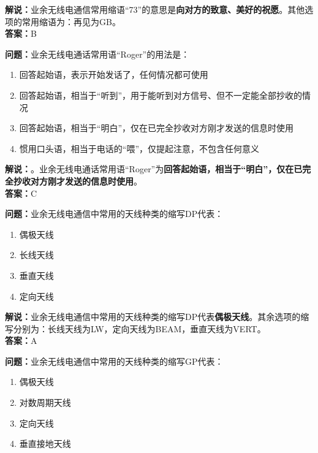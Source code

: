 \documentclass{ctexbook}
\begin{document}
\noindent\textbf{解说：}业余无线电通信常用缩语“73”的意思是\textbf{向对方的致意、美好的祝愿}。其他选项的常用缩语为：再见为GB。\\\noindent\textbf{答案：}B


\bigskip


\noindent\textbf{问题：}业余无线电通话常用语“Roger”的用法是：

\begin{enumerate}[label=\Alph*), leftmargin=3em]
	\item 回答起始语，表示开始发话了，任何情况都可使用
	\item 回答起始语，相当于“听到”，用于能听到对方信号、但不一定能全部抄收的情况
	\item 回答起始语，相当于“明白”，仅在已完全抄收对方刚才发送的信息时使用
	\item 惯用口头语，相当于电话的“喂”，仅提起注意，不包含任何意义
\end{enumerate}

\noindent\textbf{解说：}。业余无线电通话常用语“Roger”为\textbf{回答起始语，相当于“明白”，仅在已完全抄收对方刚才发送的信息时使用}。\\\noindent\textbf{答案：}C


\bigskip


\noindent\textbf{问题：}业余无线电通信中常用的天线种类的缩写DP代表：

\begin{enumerate}[label=\Alph*), leftmargin=3em]
	\item 偶极天线
	\item 长线天线
	\item 垂直天线
	\item 定向天线
\end{enumerate}

\noindent\textbf{解说：}业余无线电通信中常用的天线种类的缩写DP代表\textbf{偶极天线}。其余选项的缩写分别为：长线天线为LW，定向天线为BEAM，垂直天线为VERT。\\\noindent\textbf{答案：}A


\bigskip


\noindent\textbf{问题：}业余无线电通信中常用的天线种类的缩写GP代表：

\begin{enumerate}[label=\Alph*), leftmargin=3em]
	\item 偶极天线
	\item 对数周期天线
	\item 定向天线
	\item 垂直接地天线
\end{enumerate}
\end{document}
